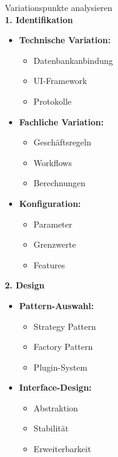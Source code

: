 \begin{KR}{Variationspunkte analysieren}\\
    \small
\textbf{1. Identifikation}
\begin{itemize}
    \item \textbf{Technische Variation:}
    \begin{itemize}
        \item Datenbankanbindung
        \item UI-Framework
        \item Protokolle
    \end{itemize}
    
    \item \textbf{Fachliche Variation:}
    \begin{itemize}
        \item Geschäftsregeln
        \item Workflows
        \item Berechnungen
    \end{itemize}
    
    \item \textbf{Konfiguration:}
    \begin{itemize}
        \item Parameter
        \item Grenzwerte
        \item Features
    \end{itemize}
\end{itemize}

\textbf{2. Design}
\begin{itemize}
    \item \textbf{Pattern-Auswahl:}
    \begin{itemize}
        \item Strategy Pattern
        \item Factory Pattern
        \item Plugin-System
    \end{itemize}
    
    \item \textbf{Interface-Design:}
    \begin{itemize}
        \item Abstraktion
        \item Stabilität
        \item Erweiterbarkeit
    \end{itemize}
\end{itemize}
\end{KR}

